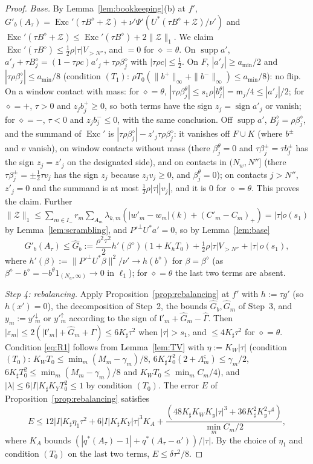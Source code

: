 \documentclass[10pt]{amsart}
\theoremstyle{definition}
\theoremstyle{remark}
\newcommand{\supp}{\operatorname{supp}}
\newcommand{\sgn}{\operatorname{sign}}
\newcommand{\lin}{\mathfrak l}
\newcommand{\Exc}{\operatorname{Exc}}
\begin{document}
\begin{proof}
\emph{Base.}  By Lemma~\ref{lem:bookkeeping}(b) at $f'$,
$G'_b(A_\tau)=\Exc'(\tau B^\diamond+\mathcal Z)+\nu'\Psi'(U^*(\tau B^\diamond+
\mathcal Z)/\nu')$ and $\Exc'(\tau B^\diamond+\mathcal Z)\le\Exc'(\tau B^\diamond)
+2\|\mathcal Z\|_1$.  We claim $\Exc'(\tau B^\diamond)\le\frac12\rho|\tau|
V_{>N''}$, and $=0$ for $\diamond=\theta$.  On $\supp a'$,
$a'_j+\tau B^\diamond_j=(1-\tau\rho c)a'_j+\tau\rho\beta^\diamond_j$ with
$|\tau\rho c|\le\frac12$.  On $F$, $|a'_j|\ge a_{\min}/2$ and
$|\tau\rho\beta^\diamond_j|\le a_{\min}/8$ (condition $(T_1)$: $\rho T_0
(\|b^+\|_\infty+\|b^-\|_\infty)\le a_{\min}/8$): no flip.  On a window
contact with mass: for $\diamond=\theta$, $|\tau\rho\beta^\theta_j|\le
s_1\rho|b^\theta_j|=\mathsf m_j/4\le|a'_j|/2$; for $\diamond=+$, $\tau>0$ and
$z_jb^+_j\ge0$, so both terms have the sign $z_j=\sgn a'_j$ or vanish; for
$\diamond=-$, $\tau<0$ and $z_jb^-_j\le0$, with the same conclusion.  Off
$\supp a'$, $B^\diamond_j=\rho\beta^\diamond_j$, and the summand of $\Exc'$ is
$|\tau\rho\beta^\diamond_j|-z'_j\tau\rho\beta^\diamond_j$: it vanishes off
$F\cup K$ (where $b^\pm$ and $v$ vanish), on window contacts without mass
(there $\beta^\theta_j=0$ and $\tau\beta^\pm_j=\tau b^\pm_j$ has the sign
$z_j=z'_j$ on the designated side), and on contacts in $(N_w,N'']$ (there
$\tau\beta^\pm_j=\pm\frac12\tau v_j$ has the sign $z_j$ because $z_jv_j\ge0$,
and $\beta^\theta_j=0$); on contacts $j>N''$, $z'_j=0$ and the summand is at
most $\frac12\rho|\tau||v_j|$, and it is $0$ for $\diamond=\theta$.  This proves
the claim.  Further $\|\mathcal Z\|_1\le\sum_{m\in I_-}r_m\sum_{A_m}
\lambda_{k,m}(|w'_m-w_m|(k)+(C'_m-C_m)_+)=|\tau|o(s_1)$ by
Lemma~\ref{lem:scrambling}, and $P'^\perp U^*a'=0$, so by
Lemma~\ref{lem:base}
\[
 G'_b(A_\tau)\le\hat G_b:=\frac{\rho^2\tau^2}2h'(\beta^\diamond)(1+K_hT_0)
 +\tfrac12\rho|\tau|V_{>N''}+|\tau|\,o(s_1),
\]
where $h'(\beta):=\|P'^\perp U^*\beta\|^2/\nu'\to h(b^\diamond)$ for
$\beta=\beta^\diamond$ (as $\beta^\diamond-b^\diamond=-b^\theta1_{(N_w,\infty)}\to0$
in $\ell_1$); for $\diamond=\theta$ the last two terms are absent.

\emph{Step 4: rebalancing.}  Apply Proposition~\ref{prop:rebalancing} at
$f'$ with $h:=\tau g'$ (so $h(x')=0$), the decomposition of Step~2, the
bounds $\hat G_b,\hat G_m$ of Step~3, and $y_m:=y'^\downarrow_m$ or
$y'^\uparrow_m$ according to the sign of $\lin'_m+\hat G_m-\hat\Gamma$.
Then $|\varepsilon_m|\le2(|\lin'_m|+\hat G_m+\hat\Gamma)\le6K_{\sharp}\tau^2$ when
$|\tau|>s_1$, and $\le4K_{\sharp}\tau^2$ for $\diamond=\theta$.  Condition
\eqref{eq:R1} follows from Lemma~\ref{lem:TV} with $\eta:=K_W|\tau|$
(condition $(T_0)$: $K_WT_0\le\min_m(M_m-\gamma_m)/8$, $6K_{\sharp}T_0^2(2+
\Lambda^\varsigma_m)\le\gamma_m/2$, $6K_{\sharp}T_0^2\le\min_m(M_m-\gamma_m)/8$ and
$K_WT_0\le\min_mC_m/4$), and $|\lambda|\le6|I|K_{\sharp}K_YT_0^2\le1$ by
condition $(T_0)$.  The error $E$ of Proposition~\ref{prop:rebalancing}
satisfies
\[
 E\le12|I|K_{\sharp}\eta_1\tau^2+6|I|K_{\sharp}K_Y|\tau|^3K_A+\frac{(48K_{\sharp}K_WK_y|\tau|^3
 +36K_{\sharp}^2K_y^2\tau^4)}{\min_mC_m/2},
\]
where $K_A$ bounds $(|q^*(A_\tau)-1|+q^*(A_\tau-a'))/|\tau|$.  By the choice
of $\eta_1$ and condition $(T_0)$ on the last two terms, $E\le\delta\tau^2/8$.


\end{proof}
\end{document}
